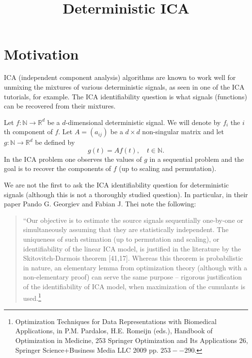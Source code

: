 \documentclass[english]{article} %
\title{Deterministic ICA}
\author{
}
\newcommand{\ra}{\rightarrow}
\newcommand{\real}{\mathbb{R}}
\renewcommand{\natural}{\mathbb{N}}
\theoremstyle{plain}
\theoremstyle{definition}
\theoremstyle{remark}
\begin{document}
\maketitle


\begin{abstract}

\end{abstract}

\section{Motivation}
\label{sec:motivation}
ICA (independent component analysis) algorithms are known to work well for unmixing the mixtures of various deterministic signals, as seen in one of the ICA tutorials, for example.
The ICA identifiability question is what signals (functions) can be recovered from their mixtures.

Let $f:\natural \ra \real^d$ be a $d$-dimensional deterministic signal. We will denote by $f_i$ the $i$th component of $f$.
Let $A = (a_{ij})$ be a $d\times d$ non-singular matrix and let $g:\natural \ra \real^d$ be defined by
\[
g(t) = A f(t), \quad t\in \natural.
\]
In the ICA problem one observes the values of $g$ in a sequential problem and the goal is to recover the components of $f$ (up to scaling and permutation).

We are not the first to ask the ICA identifiability question for deterministic signals (although this is not a thoroughly studied question).
In particular, in their paper Pando G. Georgiev and Fabian J. Thei note the following:
\begin{quote}
 ``Our objective is to estimate the source signals sequentially one-by-one or simultaneously assuming that they are statistically independent.
The uniqueness of such estimation (up to permutation and scaling), or identifiability of the linear ICA model, is justified in the literature by the Skitovitch-Darmois theorem [41,17].
 Whereas this theorem is probabilistic in nature, an elementary lemma from optimization theory (although with a non-elementary proof) can serve the same purpose -- rigorous justification of the identifiability of ICA model, when maximization of the cumulants is used.\footnote{
Optimization Techniques for Data Representations with Biomedical Applications, in
P.M. Pardalos, H.E. Romeijn (eds.), Handbook of Optimization in Medicine,	253 Springer Optimization and Its Applications 26,  Springer Science+Business Media LLC 2009
pp. $253--290$.}
\end{quote}
\end{document}
